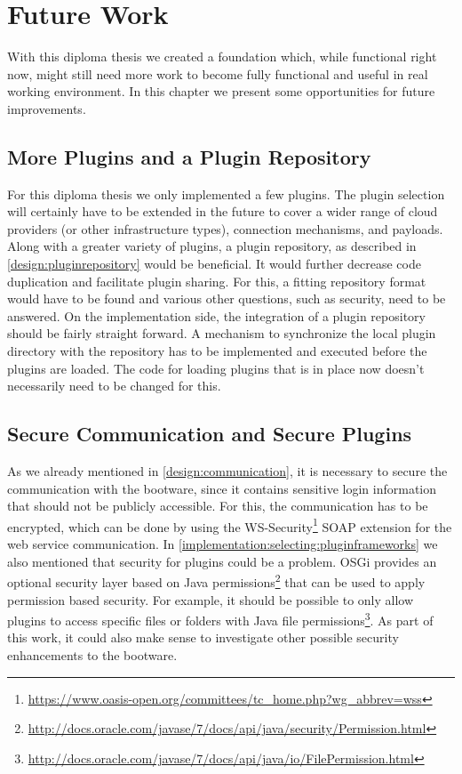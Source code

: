 \chapter{Future Work}
\label{future}

With this diploma thesis we created a foundation which, while functional right now, might still need more work to become fully functional and useful in real working environment.
In this chapter we present some opportunities for future improvements.

\section{More Plugins and a Plugin Repository}

For this diploma thesis we only implemented a few plugins.
The plugin selection will certainly have to be extended in the future to cover a wider range of cloud providers (or other infrastructure types), connection mechanisms, and payloads.
Along with a greater variety of plugins, a plugin repository, as described in \autoref{design:pluginrepository} would be beneficial.
It would further decrease code duplication and facilitate plugin sharing.
For this, a fitting repository format would have to be found and various other questions, such as security, need to be answered.
On the implementation side, the integration of a plugin repository should be fairly straight forward.
A mechanism to synchronize the local plugin directory with the repository has to be implemented and executed before the plugins are loaded.
The code for loading plugins that is in place now doesn't necessarily need to be changed for this.

\section{Secure Communication and Secure Plugins}

As we already mentioned in \autoref{design:communication}, it is necessary to secure the communication with the bootware, since it contains sensitive login information that should not be publicly accessible.
For this, the communication has to be encrypted, which can be done by using the WS-Security\footnote{\url{https://www.oasis-open.org/committees/tc_home.php?wg_abbrev=wss}} SOAP extension for the web service communication.
In \autoref{implementation:selecting:pluginframeworks} we also mentioned that security for plugins could be a problem.
OSGi provides an optional security layer based on Java permissions\footnote{\url{http://docs.oracle.com/javase/7/docs/api/java/security/Permission.html}} that can be used to apply permission based security.
For example, it should be possible to only allow plugins to access specific files or folders with Java file permissions\footnote{\url{http://docs.oracle.com/javase/7/docs/api/java/io/FilePermission.html}}.
As part of this work, it could also make sense to investigate other possible security enhancements to the bootware.

